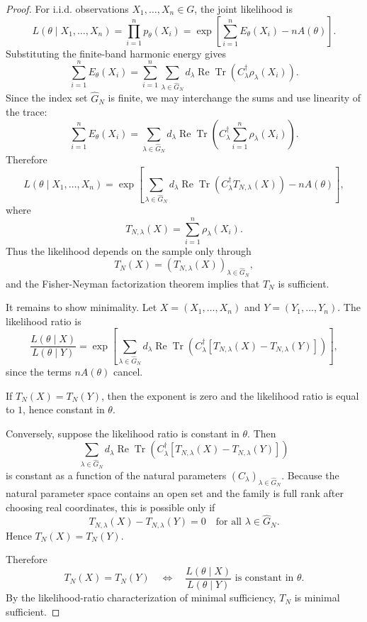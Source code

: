 \documentclass[10pt,a4paper]{amsart}
\begin{document}
\begin{proof}
For i.i.d. observations \(X_1,\dots,X_n\in G\), the joint likelihood is
\[
L(\theta\mid X_1,\dots,X_n)
=
\prod_{i=1}^n p_\theta(X_i)
=
\exp\left[
\sum_{i=1}^n E_\theta(X_i)-nA(\theta)
\right].
\]
Substituting the finite-band harmonic energy gives
\[
\sum_{i=1}^n E_\theta(X_i)
=
\sum_{i=1}^n
\sum_{\lambda\in\widehat G_N}
d_\lambda
\operatorname{Re}
\operatorname{Tr}
\left(
C_\lambda^\dagger \rho_\lambda(X_i)
\right).
\]
Since the index set \(\widehat G_N\) is finite, we may interchange the sums and use
linearity of the trace:
\[
\sum_{i=1}^n E_\theta(X_i)
=
\sum_{\lambda\in\widehat G_N}
d_\lambda
\operatorname{Re}
\operatorname{Tr}
\left(
C_\lambda^\dagger
\sum_{i=1}^n \rho_\lambda(X_i)
\right).
\]
Therefore
\[
L(\theta\mid X_1,\dots,X_n)
=
\exp\left[
\sum_{\lambda\in\widehat G_N}
d_\lambda
\operatorname{Re}
\operatorname{Tr}
\left(
C_\lambda^\dagger T_{N,\lambda}(X)
\right)
-
nA(\theta)
\right],
\]
where
\[
T_{N,\lambda}(X)=\sum_{i=1}^n \rho_\lambda(X_i).
\]
Thus the likelihood depends on the sample only through
\[
T_N(X)=
\left(
T_{N,\lambda}(X)
\right)_{\lambda\in\widehat G_N},
\]
and the Fisher-Neyman factorization theorem implies that \(T_N\) is sufficient.

It remains to show minimality. Let \(X=(X_1,\dots,X_n)\) and
\(Y=(Y_1,\dots,Y_n)\). The likelihood ratio is
\[
\frac{L(\theta\mid X)}{L(\theta\mid Y)}
=
\exp\left[
\sum_{\lambda\in\widehat G_N}
d_\lambda
\operatorname{Re}
\operatorname{Tr}
\left(
C_\lambda^\dagger
\left[
T_{N,\lambda}(X)-T_{N,\lambda}(Y)
\right]
\right)
\right],
\]
since the terms \(nA(\theta)\) cancel.

If \(T_N(X)=T_N(Y)\), then the exponent is zero and the likelihood ratio is
equal to \(1\), hence constant in \(\theta\).

Conversely, suppose the likelihood ratio is constant in \(\theta\). Then
\[
\sum_{\lambda\in\widehat G_N}
d_\lambda
\operatorname{Re}
\operatorname{Tr}
\left(
C_\lambda^\dagger
\left[
T_{N,\lambda}(X)-T_{N,\lambda}(Y)
\right]
\right)
\]
is constant as a function of the natural parameters
\((C_\lambda)_{\lambda\in\widehat G_N}\). Because the natural parameter space
contains an open set and the family is full rank after choosing real
coordinates, this is possible only if
\[
T_{N,\lambda}(X)-T_{N,\lambda}(Y)=0
\quad
\text{for all }
\lambda\in\widehat G_N.
\]
Hence \(T_N(X)=T_N(Y)\).

Therefore
\[
T_N(X)=T_N(Y)
\quad\Longleftrightarrow\quad
\frac{L(\theta\mid X)}{L(\theta\mid Y)}
\text{ is constant in }\theta.
\]
By the likelihood-ratio characterization of minimal sufficiency,
\(T_N\) is minimal sufficient.
\end{proof}
\end{document}
